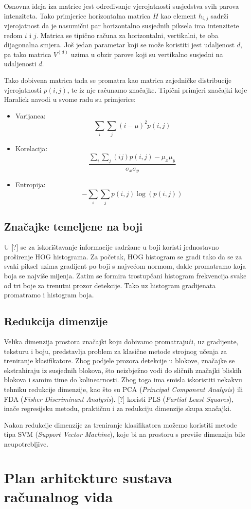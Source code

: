 \documentclass[seminar]{fer}
\begin{document}
Osnovna ideja iza matrice jest određivanje vjerojatnosti susjedstva svih parova intenziteta. Tako primjerice horizontalna matrica $H$ kao element
$h_{i,j}$ sadrži vjerojatnost da je nasumični par horizontalno susjednih piksela ima intenzitete redom $i$ i $j$. Matrica se tipično računa za horizontalni, vertikalni, te oba dijagonalna smjera. Još jedan parametar koji se može koristiti jest udaljenost $d$, pa tako matrica $V^{(d)}$ uzima u obzir 
parove koji su vertikalno susjedni na udaljenosti $d$.


Tako dobivena matrica tada se promatra kao matrica zajedničke distribucije vjerojatnosti $p(i, j)$, te iz nje računamo značajke. Tipični
primjeri značajki koje Haralick navodi u svome radu su primjerice:

\begin{itemize}
  \item
  Varijanca: $$\sum_{i}\sum_{j}(i - \mu)^2p(i, j)$$
  \item
  Korelacija: $$\frac{\sum_{i}\sum_{j}(ij)p(i,j) - \mu_{x}\mu_{y}}{\sigma_{x}\sigma_{y}}$$
  \item
  Entropija: $$-\sum_{i}\sum_{j}p(i, j)\log(p(i, j))$$
\end{itemize}

\subsection{Značajke temeljene na boji}


U [?] se za iskorištavanje informacije sadržane u boji koristi jednostavno proširenje HOG histograma. Za početak, HOG histogram se gradi tako da se za
svaki piksel uzima gradijent po boji s najvećom normom, dakle promatramo koja boja se najviše mijenja. Zatim se formira trostupčani histogram frekvencija svake od tri boje za trenutni prozor detekcije. Tako uz histogram gradijenata promatramo i histogram boja.


\subsection{Redukcija dimenzije}


Velika dimenzija prostora značajki koju dobivamo promatrajući, uz gradijente, teksturu i boju, predstavlja problem za klasične metode strojnog učenja
za treniranje klasifikatore. Zbog podjele prozora detekcije u blokove, značajke se ekstrahiraju iz susjednih blokova, što neizbježno vodi do
sličnih značajki bliskih blokova i samim time do kolinearnosti. Zbog toga ima smisla iskoristiti nekakvu tehniku redukcije dimenzije, kao što su
PCA (\emph{Principal Component Analysis}) ili FDA (\emph{Fisher Discriminant Analysis}). [?] koristi PLS (\emph{Partial Least Squares}), inače 
regresijsku metodu, praktičnu i za redukciju dimenzije skupa značajki. 

Nakon redukcije dimenzije za treniranje klasifikatora možemo koristiti metode tipa SVM (\emph{Support Vector Machine}), koje bi na prostoru s 
previše dimenzija bile neupotrebljive.


\section{Plan arhitekture sustava računalnog vida}




\end{document}
